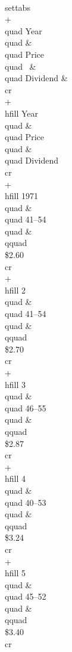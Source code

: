 \beginuser \obeyspaces
\\settabs \\+ \\quad Year \\quad \& \\quad Price \\quad
\                                            \& \\quad Dividend \& \\cr
\\+ \\hfill Year \\quad \& \\quad Price  \\quad \& \\quad Dividend \\cr
\\+ \\hfill 1971 \\quad \& \\quad 41--54 \\quad \& \\qquad \\\$2.60   \\cr
\\+ \\hfill 2    \\quad \& \\quad 41--54 \\quad \& \\qquad \\\$2.70 \\cr
\\+ \\hfill 3    \\quad \& \\quad 46--55 \\quad \& \\qquad \\\$2.87 \\cr
\\+ \\hfill 4    \\quad \& \\quad 40--53 \\quad \& \\qquad \\\$3.24 \\cr
\\+ \\hfill 5    \\quad \& \\quad 45--52 \\quad \& \\qquad \\\$3.40 \\cr
\enduser

